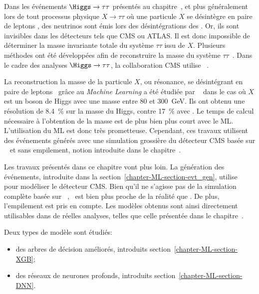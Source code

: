 \par
Dans les événements $\Higgs\to\tau\tau$ présentés au chapitre~,
et plus généralement lors de tout processus physique $X\to\tau\tau$ où une particule $X$ se désintègre en paire de leptons \tau,
des neutrinos sont émis lors des désintégrations des \tau.
Or, ils sont invisibles dans les détecteurs tels que CMS ou ATLAS.
Il est donc impossible de déterminer la masse invariante totale du système $\tau\tau$ issu de $X$.
Plusieurs méthodes ont été développées afin de reconstruire la masse du système $\tau\tau$~\cite{ELAGIN2011481,Barr_2011,Gripaios_2013}.
Dans le cadre des analyses $\Higgs\to\tau\tau$, la collaboration CMS utilise \SVFIT~\cite{SVFit_Bianchini_2014}.
\par
La reconstruction la masse de la particule $X$, ou résonance, se désintégrant en paire de leptons \tau\ grâce au \emph{Machine Learning}
a été étudiée par \citeauthor{BARTSCHI201929}~\cite{BARTSCHI201929} dans le cas où $X$ est un boson de Higgs avec une masse entre \num{80} et \SI{300}{\GeV}.
Ils ont obtenu une résolution de \SI{8.4}{\%} sur la masse du Higgs, contre \SI{17}{\%} avec \SVFIT.
Le temps de calcul nécessaire à l'obtention de la masse est de plus bien plus court avec le ML.
L'utilisation du ML est donc très prometteuse.
Cependant,
ces travaux utilisent des événements générés
avec une simulation grossière du détecteur CMS basée sur
\DELPHES~\cite{Delphes,Delphes_additions}
et sans empilement, notion introduite dans le chapitre~.
\par
Les travaux présentés dans ce chapitre vont plus loin.
La génération des événements, introduite dans la section~\ref{chapter-ML-section-evt_gen},
utilise \FASTSIM~\cite{FastSim_2011,FastSim_2014,FastSim_2017_1,FastSim_2017_2}
pour modéliser le détecteur CMS.
Bien qu'il ne s'agisse pas de la simulation complète basée sur \GEANTfour~\cite{geant4_2003,geant4_2006,geant4_2016},
\FASTSIM\ est bien plus proche de la réalité que \DELPHES.
De plus, l'empilement est pris en compte.
Les modèles obtenus sont ainsi directement utilisables dans de réelles analyses, telles que celle présentée dans le chapitre~.
\par
Deux types de modèle sont étudiés:
\begin{itemize}
\item des arbres de décision améliorés, introduits section~\ref{chapter-ML-section-XGB};
\item des réseaux de neurones profonds, introduits section~\ref{chapter-ML-section-DNN}.
\end{itemize}
